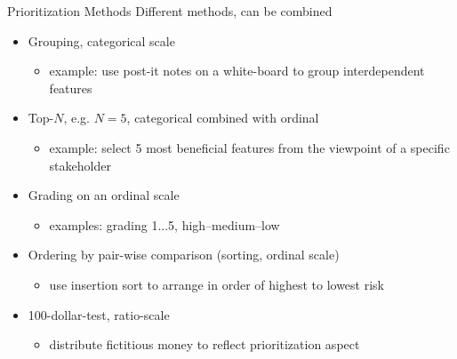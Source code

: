 \begin{Slide}{Prioritization Methods}
Different methods, can be combined
\begin{itemize}
\item Grouping, categorical scale  
\begin{itemize}
\item example: use post-it notes on a white-board to group interdependent features
\end{itemize}
\item Top-$N$, e.g. $N = 5$, categorical combined with ordinal
\begin{itemize}
\item example: select 5 most beneficial features from the viewpoint of a specific stakeholder
\end{itemize}
\item Grading on an ordinal scale
\begin{itemize}
\item examples: grading 1...5, high--medium--low
\end{itemize}
\item Ordering by pair-wise comparison (sorting, ordinal scale)
\begin{itemize}
\item use insertion sort to arrange in order of highest to lowest risk
\end{itemize}
\item 100-dollar-test, ratio-scale
\begin{itemize}
\item distribute fictitious money to reflect prioritization aspect

\end{itemize}
\end{itemize}
\end{Slide}